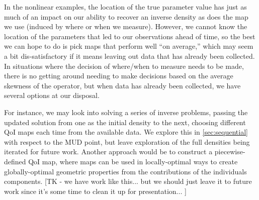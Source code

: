 In the nonlinear examples, the location of the true parameter value has just as much of an impact on our ability to recover an inverse density as does the map we use (induced by where or when we measure).
However, we cannot know the location of the parameters that led to our observations ahead of time, so the best we can hope to do is pick maps that perform well ``on average,'' which may seem a bit dis-satisfactory if it means leaving out data that has already been collected.
In situations where the decision of where/when to measure needs to be made, there is no getting around needing to make decisions based on the average skewness of the operator, but when data has already been collected, we have several options at our disposal.

For instance, we may look into solving a series of inverse problems, passing the updated solution from one as the initial density to the next, choosing different QoI maps each time from the available data.
We explore this in \ref{sec:sequential} with respect to the MUD point, but leave exploration of the full densities being iterated for future work.
Another approach would be to construct a piecewise-defined QoI map, where maps can be used in locally-optimal ways to create globally-optimal geometric properties from the contributions of the individuals components.
[TK - we have work like this... but we should just leave it to future work since it's some time to clean it up for presentation... ]
